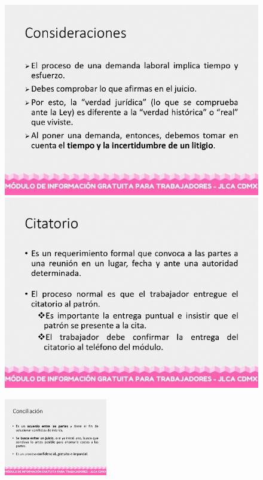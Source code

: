 \begin{figure}[H] 
  \centering
  \begin{minipage}[b]{0.45\textwidth}
    \includegraphics[width=\textwidth]{Figures/A2_9.jpg}
  \end{minipage}
  \begin{minipage}[b]{0.45\textwidth}
    \includegraphics[width=\textwidth]{Figures/A2_10.jpg}
  \end{minipage}
  \label{fig:A2_3_5}
\end{figure}
\begin{figure}[H] 
    \centering
    \includegraphics[width=0.4\textwidth]{Figures/A2_11.jpg}
    \label{fig:A2_3_6}
\end{figure}
